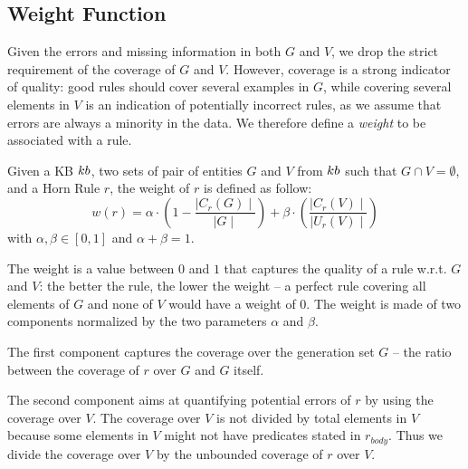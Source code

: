 \subsection{Weight Function} \label{sec:krd_weight_fun}
Given the errors and missing information in both $G$ and $V$, we drop the strict requirement of the coverage of $G$ and $V$. However, coverage is a strong indicator of quality: good rules should cover several examples in $G$, while covering several elements in $V$ is an indication of potentially incorrect rules, as we assume that errors are always a minority in the data. 
We therefore define a \emph{weight} to be associated with a rule. %


\begin{definition}
	Given a KB ${\sc kb}$, two sets of pair of entities $G$ and $V$ from ${\sc kb}$ such that $G \cap V = \emptyset$, and a Horn Rule $r$, the weight of $r$ is defined as follow:
	\begin{equation} \label{eq:weight_fun}
	w(r) = \alpha \cdot (1-\frac{\mid C_{r}(G)\mid}{\mid G \mid}) +\beta \cdot (\frac{\mid C_{r}(V) \mid}{\mid U_{r}(V)\mid})
	\end{equation}
	with $\alpha,\beta \in [0,1]$ and $\alpha + \beta = 1$. 
\end{definition}

The weight is a value between $0$ and $1$ that captures the quality of a rule w.r.t. $G$ and $V$: the better the rule, the lower the weight -- a perfect rule covering all elements of $G$ and none of $V$ would have a weight of $0$.
%
The weight is made of two components normalized by the two parameters $\alpha$ and $\beta$.
%
\begin{inparaenum}[\itshape1)]
	\item The first component captures the coverage over the generation set $G$ -- the ratio between the coverage of $r$ over $G$ and $G$ itself. 
	\item The second component aims at quantifying potential errors of $r$ by using the coverage over $V$. The coverage over $V$ is not divided by total elements in $V$ because some elements in $V$ might not have predicates stated in $r_{body}$.
	Thus we divide the coverage over $V$ by the unbounded coverage of $r$ over $V$. 
\end{inparaenum}

